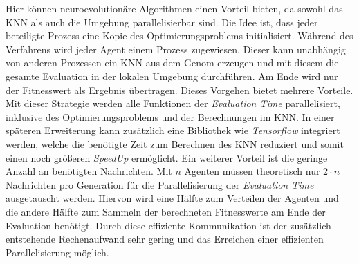 Hier können neuroevolutionäre Algorithmen einen Vorteil bieten, da sowohl das \ac{KNN} als auch die Umgebung parallelisierbar sind. Die Idee ist, dass jeder beteiligte Prozess eine Kopie des Optimierungsproblems initialisiert. Während des Verfahrens wird jeder Agent einem Prozess zugewiesen. Dieser kann unabhängig von anderen Prozessen ein \ac{KNN} aus dem Genom erzeugen und mit diesem die gesamte Evaluation in der lokalen Umgebung durchführen. Am Ende wird nur der Fitnesswert als Ergebnis übertragen. Dieses Vorgehen bietet mehrere Vorteile. Mit dieser Strategie werden alle Funktionen der \emph{Evaluation Time} parallelisiert, inklusive des Optimierungsproblems und der Berechnungen im \ac{KNN}. In einer späteren Erweiterung kann zusätzlich eine Bibliothek wie \emph{Tensorflow} integriert werden, welche die benötigte Zeit zum Berechnen des \ac{KNN} reduziert und somit einen noch größeren \emph{SpeedUp} ermöglicht. Ein weiterer Vorteil ist die geringe Anzahl an benötigten Nachrichten. Mit $n$ Agenten müssen theoretisch nur $2 \cdot n$ Nachrichten pro Generation für die Parallelisierung der \emph{Evaluation Time} ausgetauscht werden. Hiervon wird eine Hälfte zum Verteilen der Agenten und die andere Hälfte zum Sammeln der berechneten Fitnesswerte am Ende der Evaluation benötigt. Durch diese effiziente Kommunikation ist der zusätzlich entstehende Rechenaufwand sehr gering und das Erreichen einer effizienten Parallelisierung möglich.

 



